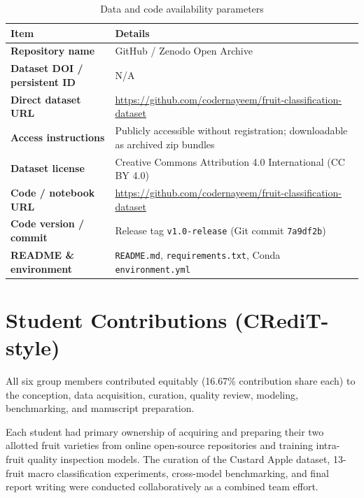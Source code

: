 \documentclass[11pt,a4paper]{article}
\begin{document}
\begin{table}[H]
\centering\small
\begin{tabular}{|p{}|p{}|}
\hline
\textbf{Item} & \textbf{Details} \\
\hline
\textbf{Repository name} & GitHub / Zenodo Open Archive \\ \hline
\textbf{Dataset DOI / persistent ID} & N/A \\ \hline
\textbf{Direct dataset URL} & \url{https://github.com/codernayeem/fruit-classification-dataset} \\ \hline
\textbf{Access instructions} & Publicly accessible without registration; downloadable as archived zip bundles \\ \hline
\textbf{Dataset license} & Creative Commons Attribution 4.0 International (CC BY 4.0) \\ \hline
\textbf{Code / notebook URL} & \url{https://github.com/codernayeem/fruit-classification-dataset} \\ \hline
\textbf{Code version / commit} & Release tag \texttt{v1.0-release} (Git commit \texttt{7a9df2b}) \\ \hline
\textbf{README \& environment} & \texttt{README.md}, \texttt{requirements.txt}, Conda \texttt{environment.yml} \\ \hline
\end{tabular}
\caption{Data and code availability parameters}
\label{tab:data-availability}
\end{table}

\section{Student Contributions (CRediT-style)}
All six group members contributed equitably (16.67\% contribution share each) to the conception, data acquisition, curation, quality review, modeling, benchmarking, and manuscript preparation. 

Each student had primary ownership of acquiring and preparing their two allotted fruit varieties from online open-source repositories and training intra-fruit quality inspection models. The curation of the Custard Apple dataset, 13-fruit macro classification experiments, cross-model benchmarking, and final report writing were conducted collaboratively as a combined team effort.
\end{document}
